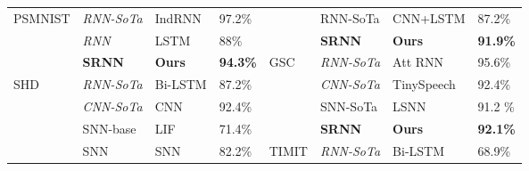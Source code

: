 \documentclass[fleqn,10pt]{wlscirep}
\begin{document}
\begin{table}[]
\begin{tabular}{|l|l|l|l|l|l|l|l|}
\multirow{3}{*}{PSMNIST} & \em  RNN-SoTa           & IndRNN\cite{li2018independently}        & 97.2\%                                    &                        & RNN-SoTa                                                      & CNN+LSTM\cite{wang2016interacting}       & 87.2\%                                                      \\ \cline{2-4} \cline{6-8} 
                         & \em  RNN                & LSTM\cite{arjovsky2016unitary} & 88\%                                      &                        & \cellcolor{green}\bf SRNN                        & \cellcolor{green}\bf Ours                    & \cellcolor{green}\bf 91.9\%                     \\ \cline{2-8} 
                         & \cellcolor{green}\bf SRNN & \cellcolor{green}\bf Ours          & \cellcolor{green}\bf 94.3\% & \multirow{4}{*}{GSC}   & \em  RNN-SoTa                                  & Att RNN\cite{de2018neural}               & 95.6\%                                                       \\ \cline{1-4} \cline{6-8} 
\multirow{6}{*}{SHD}     & \em  RNN-SoTa           & Bi-LSTM                                         & 87.2\%                                   &                        & \em CNN-SoTa                                                      & TinySpeech\cite{wong2020tinyspeech}            & 92.4\%                                                 \\ \cline{2-4} \cline{6-8} 
                         & \em  CNN-SoTa           & CNN\cite{cramer2019heidelberg} & 92.4\%                                    &                        & SNN-SoTa                                                      & LSNN\cite{bellec2020solution}            & 91.2  \%                   \\ \cline{2-4} \cline{6-8} 
                         & SNN-base                               & LIF\cite{cramer2019heidelberg} & 71.4\%                                    &                        &\cellcolor{green}\bf SRNN                        & \cellcolor{green}\bf Ours                    & \cellcolor{green}\bf 92.1\%                                                             \\ \cline{2-8} 
                         &SNN                               & SNN\cite{zenke2020remarkable} & 82.2\%                                       & \multirow{3}{*}{TIMIT} & \em  RNN-SoTa                                  & Bi-LSTM\cite{graves2005framewise}        & 68.9\%                                                       \\ \cline{2-4} \cline{6-8} 

\end{tabular}
\end{table}
\end{document}
